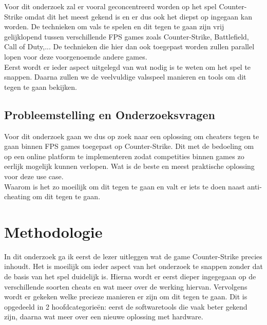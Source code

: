 \documentclass[pdftex,a4paper,12pt,twoside]{report}
\begin{document}
Voor dit onderzoek zal er vooral geconcentreerd worden op het spel Counter-Strike omdat dit het meest gekend is en er dus ook het diepst op ingegaan kan worden. De technieken om vals te spelen en dit tegen te gaan zijn vrij gelijklopend tussen verschillende FPS games zoals Counter-Strike, Battlefield, Call of Duty,... De technieken die hier dan ook toegepast worden zullen parallel lopen voor deze voorgenoemde andere games.
\\

Eerst wordt er ieder aspect uitgelegd van wat nodig is te weten om het spel te snappen. Daarna zullen we de veelvuldige valsspeel manieren en tools om dit tegen te gaan bekijken.


\section{Probleemstelling en Onderzoeksvragen}
\label{sec:onderzoeksvragen}

Voor dit onderzoek gaan we dus op zoek naar een oplossing om cheaters tegen te gaan binnen FPS games toegepast op Counter-Strike. Dit met de bedoeling om op een online platform te implementeren zodat competities binnen games zo eerlijk mogelijk kunnen verlopen. Wat is de beste en meest praktische oplossing voor deze use case. 
\\

Waarom is het zo moeilijk om dit tegen te gaan en valt er iets te doen naast anti-cheating om dit tegen te gaan.


\chapter{Methodologie}
\label{ch:methodologie}


In dit onderzoek ga ik eerst de lezer uitleggen wat de game Counter-Strike precies inhoudt. Het is moeilijk om ieder aspect van het onderzoek te snappen zonder dat de basis van het spel duidelijk is. Hierna wordt er eerst dieper ingegegaan op de verschillende soorten cheats en wat meer over de werking hiervan. Vervolgens wordt er gekeken welke precieze manieren er zijn om dit tegen te gaan. Dit is opgedeeld in 2 hoofdcategorieën: eerst de softwaretools die vaak beter gekend zijn, daarna wat meer over een nieuwe oplossing met hardware. 
\\
\end{document}
